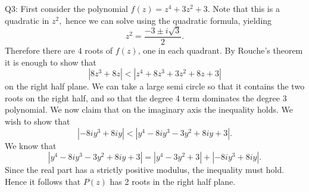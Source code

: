 \documentclass[letterpaper]{article}
\begin{document}
\noindent Q3: First consider the polynomial $f(z) = z^4 + 3z^2 +3.$ Note that this is a quadratic in $z^2, $ hence we can solve using the quadratic formula, yielding $$z^2 = \frac{-3 \pm i \sqrt{3}}{2}.$$ Therefore there are $4 $ roots of $f(z)$, one in each quadrant. By Rouche's theorem it is enough to show that $$|8z^3+ 8z|< |z^4 + 8z^3 + 3z^2 + 8z +3| $$ on the right half plane. We can take a large semi circle so that it contains the two roots on the right half, and so that the degree 4 term dominates the degree 3 polynomial. 
We now claim that on the imaginary axis the inequality holds. We wish to show that $$|-8iy^3 + 8iy| < |y^4 - 8iy^3 -3y^2 +8iy +3|. $$ We know that $$ |y^4 - 8iy^3 -3y^2 +8iy +3| = |y^4 -3y^2+3| + |-8iy^3 + 8iy|.$$ Since the real part has a strictly positive modulus, the inequality must hold.  Hence it follows that $P(z)$ has 2 roots in the right half plane. 
\end{document}
